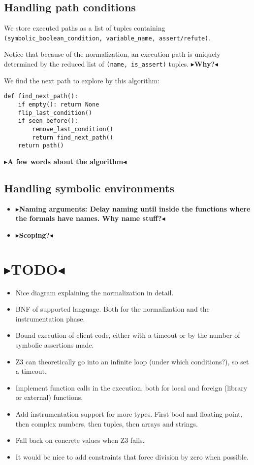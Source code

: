 \documentclass[11pt]{report}
\newcommand{\todo}[1]{{\color[rgb]{.5,0,0}\textbf{$\blacktriangleright$#1$\blacktriangleleft$}}}
\begin{document}
\section{Handling path conditions}
We store executed paths as a list of tuples containing \\
\verb|(symbolic_boolean_condition, variable_name, assert/refute)|.

Notice that because of the normalization, an execution path is
uniquely determined by the reduced list of \verb|(name, is_assert)|
tuples. \todo{Why?}

We find the next path to explore by this algorithm:
\begin{verbatim}
def find_next_path():
    if empty(): return None
    flip_last_condition()
    if seen_before():
        remove_last_condition()
        return find_next_path()
    return path()
\end{verbatim}

\todo{A few words about the algorithm}

\section{Handling symbolic environments}
\begin{itemize}
\item \todo{Naming arguments: Delay naming until inside the functions
  where the formals have names. Why name stuff?}
\item \todo{Scoping?}
\end{itemize}


\chapter{\todo{TODO}}

\begin{itemize}
  \item Nice diagram explaining the normalization in detail.
  \item BNF of supported language. Both for the normalization and the
    instrumentation phase.
  \item Bound execution of client code, either with a timeout or by
    the number of symbolic assertions made.
  \item Z3 can theoretically go into an infinite loop (under which
    conditions?), so set a timeout.
  \item Implement function calls in the execution, both for local and
    foreign (library or external) functions.
  \item Add instrumentation support for more types. First bool and
    floating point, then complex numbers, then tuples, then arrays and
    strings.
  \item Fall back on concrete values when Z3 fails.
  \item It would be nice to add constraints that force division by
    zero when possible.
\end{itemize}
\end{document}

